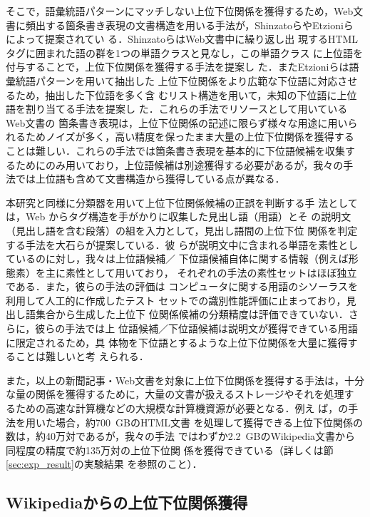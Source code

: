 \documentclass[japanese]{jnlp_1.4}
\begin{document}
そこで，語彙統語パターンにマッチしない上位下位関係を獲得するため，Web文
書に頻出する箇条書き表現の文書構造を用いる手法が，ShinzatoらやEtzioniら
によって提案されてい
る\cite{Shinzato_2004,Etzioni_2005}．ShinzatoらはWeb文書中に繰り返し出
現するHTMLタグに囲まれた語の群を1つの単語クラスと見なし，この単語クラス
に上位語を付与することで，上位下位関係を獲得する手法を提案し
た\cite{Shinzato_2004}．またEtzioniらは語彙統語パターンを用いて抽出した
上位下位関係をより広範な下位語に対応させるため，抽出した下位語を多く含
むリスト構造を用いて，未知の下位語に上位語を割り当てる手法を提案し
た\cite{Etzioni_2005}．これらの手法でリソースとして用いているWeb文書の
箇条書き表現は，上位下位関係の記述に限らず様々な用途に用いられるためノイズが多く，高い精度を保ったまま大量の上位下位関係を獲得する
ことは難しい．これらの手法では箇条書き表現を基本的に下位語候補を収集す
るためにのみ用いており，上位語候補は別途獲得する必要があるが，我々の手
法では上位語も含めて文書構造から獲得している点が異なる．

{本研究と同様に分類器を用いて上位下位関係候補の正誤を判断する手
  法としては，Web からタグ構造を手がかりに収集した見出し語（用語）とそ
  の説明文（見出し語を含む段落）の組を入力として，見出し語間の上位下位
  関係を判定する手法を大石らが提案している}\cite{Oishi_06}．{彼
  らが説明文中に含まれる単語を素性としているのに対し，我々は上位語候補／
  下位語候補自体に関する情報（例えば形態素）を主に素性として用いており，
  それぞれの手法の素性セットはほぼ独立である．また，彼らの手法の評価は
  コンピュータに関する用語のシソーラスを利用して人工的に作成したテスト
  セットでの識別性能評価に止まっており，見出し語集合から生成した上位下
  位関係候補の分類精度は評価できていない．さらに，彼らの手法では上
  位語候補／下位語候補は説明文が獲得できている用語に限定されるため，具
  体物を下位語とするような上位下位関係を大量に獲得することは難しいと考
  えられる．}

また，以上の新聞記事・Web文書を対象に上位下位関係を獲得する手法は，十分
な量の関係を獲得するために，大量の文書が扱えるストレージやそれを処理す
るための高速な計算機などの大規模な計算機資源が必要となる．{例え
  ば，}\cite{Sumida_2006}{の手法を用いた場合，約700~GBのHTML文書
  を処理して獲得できる上位下位関係の数は，約40万対であるが，我々の手法
  ではわずか2.2~GBのWikipedia文書から同程度の精度で約135万対の上位下位関
  係を獲得できている（詳しくは節}\ref{sec:exp_result}{の実験結果
    を参照のこと）．}


\subsection{Wikipediaからの上位下位関係獲得}
\end{document}
